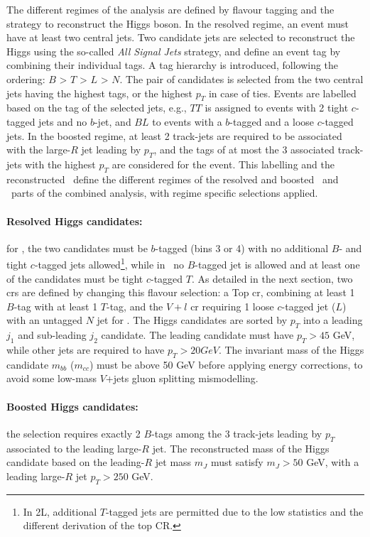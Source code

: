 The different regimes of the analysis are defined by flavour tagging and the strategy to reconstruct the Higgs boson. In the resolved regime, an event must have at least two central jets. Two candidate jets are selected to reconstruct the Higgs using the so-called \textit{All Signal Jets} strategy, and define an event tag by combining their individual tags. A tag hierarchy is introduced, following the ordering: $B$ > $T$ > $L$ > $N$. The pair of candidates is selected from the two central jets having the highest tags, or the highest $p_T$ in case of ties. Events are labelled based on the tag of the selected jets, e.g., $TT$ is assigned to events with 2 tight $c$-tagged jets and no $b$-jet, and $BL$ to events with a $b$-tagged and a loose $c$-tagged jets. In the boosted regime, at least 2 track-jets are required to be associated with the large-$R$ jet leading by $p_T$, and the tags of at most the 3 associated track-jets with the highest $p_T$ are considered for the event. This labelling and the reconstructed \ptv\ define the different regimes of the resolved and boosted \vhb\ and \vhc\ parts of the combined analysis, with regime specific selections applied.

\paragraph{Resolved Higgs candidates:} for \vhb, the two candidates must be $b$-tagged (bins 3 or 4) with no additional $B$- and tight $c$-tagged jets allowed\footnote{In 2L, additional $T$-tagged jets are permitted due to the low statistics and the different derivation of the top CR.}, while in \vhc\ no $B$-tagged jet is allowed and at least one of the candidates must be tight $c$-tagged $T$. As detailed in the next section, two \glspl{cr} are defined by changing this flavour selection: a Top \gls{cr}, combining at least 1 $B$-tag with at least 1 $T$-tag, and the $V+l$ \gls{cr} requiring 1 loose $c$-tagged jet ($L$) with an untagged $N$ jet for \vhc. The Higgs candidates are sorted by $p_T$ into a leading $j_1$ and sub-leading $j_2$ candidate. The leading candidate must have $p_T > 45$ GeV, while other jets are required to have $p_T > 20 GeV$. The invariant mass of the Higgs candidate $m_{bb}$ ($m_{cc}$) must be above 50 GeV before applying energy corrections, to avoid some low-mass $V$+jets gluon splitting mismodelling.  

\paragraph{Boosted Higgs candidates:} the selection requires exactly 2 $B$-tags among the 3 track-jets leading by $p_T$ associated to the leading large-$R$ jet. The reconstructed mass of the Higgs candidate based on the leading-$R$ jet mass $m_J$ must satisfy $m_J > 50$ GeV, with a leading large-$R$ jet $p_T > 250$ GeV. \\

